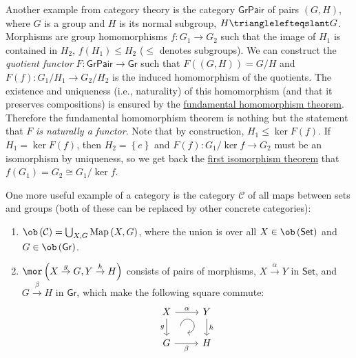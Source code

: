 \begin{example}
    \label{quotient functor}Another example from category theory is
    the category $\mathsf{GrPair}$ of pairs $\left(G,H\right)$, where
    $G$ is a group and $H$ is its normal subgroup, $H\trianglelefteqslant G$.
    Morphisms are group homomorphisms $f:G_{1}\to G_{2}$ such that the
    image of $H_{1}$ is contained in $H_{2}$, $f\left(H_{1}\right)\leq H_{2}$
    ($\leq$ denotes subgroups). We can construct the \emph{quotient functor} $F:\mathsf{GrPair}\to\mathsf{Gr}$
    such that $F\left(\left(G,H\right)\right)=G/H$ and $F\left(f\right):G_{1}/H_{1}\to G_{2}/H_{2}$
    is the induced homomorphism of the quotients. The existence and uniqueness
    (i.e., naturality) of this homomorphism (and that it preserves compositions)
    is ensured by the \href{https://en.wikipedia.org/wiki/Fundamental_theorem_on_homomorphisms}{fundamental homomorphism theorem}.
    Therefore the fundamental homomorphism theorem is nothing but the
    statement that $F$\emph{ is naturally a functor}. Note that by
    construction, $H_{1}\leq\ker F(f)$. If $H_{1}=\ker F\left(f\right)$,
    then $H_{2}=\left\{ e\right\} $ and $F(f):G_{1}/\ker f\to G_{2}$
    must be an isomorphism by uniqueness, so we get back the \href{https://en.wikipedia.org/wiki/Isomorphism_theorems\#First_isomorphism_theorem}{first isomorphism theorem}
    that $f\left(G_{1}\right)=G_{2}\cong G_{1}/\ker f$.
\end{example}
%
\begin{example}
    One more useful example of a category is the category $\mathcal{C}$
    of all maps between sets and groups (both of these can be replaced
    by other concrete categories):
    \begin{enumerate}
        \item $\ob\left(\mathcal{C}\right)=\bigcup_{X,G}\mathrm{Map}\left(X,G\right)$,
        where the union is over all $X\in\ob\left(\mathsf{Set}\right)$ and
        $G\in\ob\left(\mathsf{Gr}\right)$.
        \item $\mor\left(X\overset{g}{\to}G,Y\overset{h}{\to}H\right)$ consists
        of pairs of morphisms, $X\overset{\alpha}{\to}Y$ in $\mathsf{Set}$,
        and $G\overset{\beta}{\to}H$ in $\mathsf{Gr}$, which make the following
        square commute: \[\begin{tikzcd}[every matrix/.append style={name=m},   
        execute at end picture={\draw [<-] ([xshift=-2em,yshift=1mm]m-2-2.north) arc[start angle=-90,delta angle=270,radius=0.25cm];}]
        X \arrow[r,"\alpha"]\arrow[d,swap,"g"]& Y\arrow[d,"h"] \\
        G\arrow[r,swap,"\beta"]& H
        \end{tikzcd}\]
    \end{enumerate}
\end{example}
